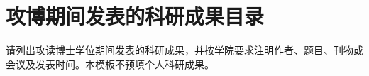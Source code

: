 \begingroup
{}
\chapter{攻博期间发表的科研成果目录}
\endgroup
请列出攻读博士学位期间发表的科研成果，并按学院要求注明作者、题目、刊物或会议及发表时间。本模板不预填个人科研成果。
